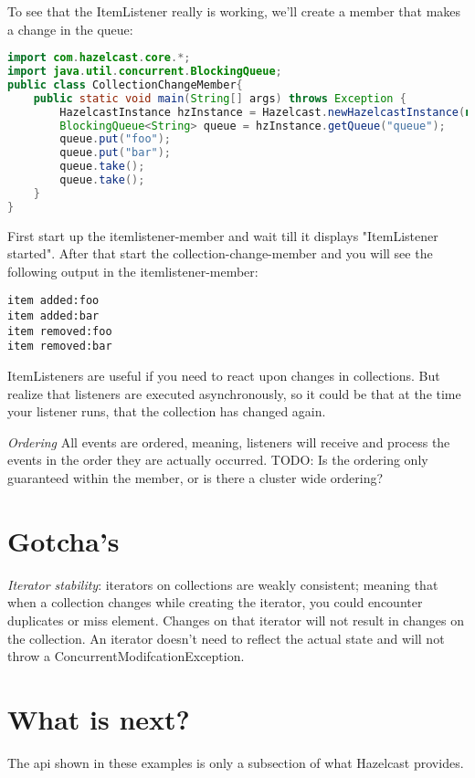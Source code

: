 To see that the ItemListener really is working, we'll create a member that makes a change in the queue:
\begin{lstlisting}[language=java]
import com.hazelcast.core.*;
import java.util.concurrent.BlockingQueue;
public class CollectionChangeMember{
    public static void main(String[] args) throws Exception {
        HazelcastInstance hzInstance = Hazelcast.newHazelcastInstance(null);
        BlockingQueue<String> queue = hzInstance.getQueue("queue");
        queue.put("foo");
        queue.put("bar");
        queue.take();
        queue.take();
    }
}
\end{lstlisting}
First start up the itemlistener-member and wait till it displays "ItemListener started". After that start the collection-change-member and you will see the following output in the itemlistener-member:
\begin{verbatim}
item added:foo
item added:bar
item removed:foo
item removed:bar
\end{verbatim}
ItemListeners are useful if you need to react upon changes in collections. But realize that listeners are executed asynchronously, so it could be that at the time your listener runs, that the collection has changed again. 

\emph{Ordering} All events are ordered, meaning, listeners will receive and process the events in the order they are actually occurred. TODO: Is the ordering only guaranteed within the member, or is there a cluster wide ordering?

\section{Gotcha's}
\emph{Iterator stability}: iterators on collections are weakly consistent; meaning that when a collection changes while creating the iterator, you could encounter duplicates or miss element. Changes on that iterator will not result in changes on the collection. An iterator doesn't need to reflect the actual state and will not throw a ConcurrentModifcationException.

\section{What is next?}
The api shown in these examples is only a subsection of what Hazelcast provides.